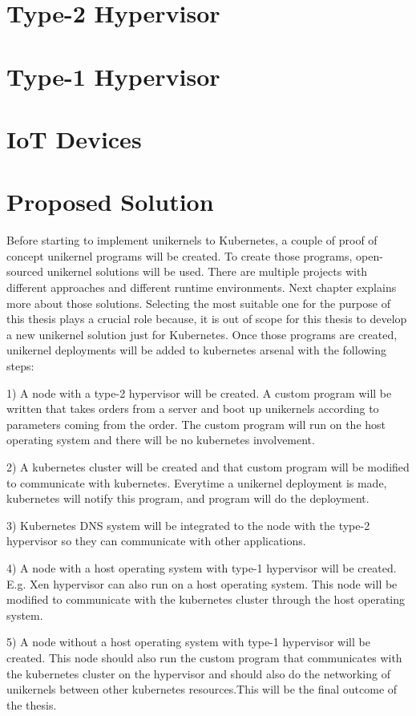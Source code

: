 \section{Type-2 Hypervisor}
\section{Type-1 Hypervisor}
\section{IoT Devices}


\section{Proposed Solution}

Before starting to implement unikernels to Kubernetes, a couple of proof of concept unikernel programs will be created. To create those programs, open-sourced unikernel solutions will be used. There are multiple projects with different approaches and different runtime environments. Next chapter explains more about those solutions. Selecting the most suitable one for the purpose of this thesis plays a crucial role because, it is out of scope for this thesis to develop a new unikernel solution just for Kubernetes. Once those programs are created, unikernel deployments will be added to kubernetes arsenal with the following steps:

1) A node with a type-2 hypervisor will be created. A custom program will be written that takes orders from a server and boot up unikernels according to parameters coming from the order. The custom program will run on the host operating system and there will be no kubernetes involvement.

2) A kubernetes cluster will be created and that custom program will be modified to communicate with kubernetes. Everytime a unikernel deployment is made, kubernetes will notify this program, and program will do the deployment.

3) Kubernetes DNS system will be integrated to the node with the type-2 hypervisor so they can communicate with other applications.

4) A node with a host operating system with type-1 hypervisor will be created. E.g. Xen hypervisor can also run on a host operating system. This node will be modified to communicate with the kubernetes cluster through the host operating system. 

5) A node without a host operating system with type-1 hypervisor will be created. This node should also run the custom program that communicates with the kubernetes cluster on the hypervisor and should also do the networking of unikernels between other kubernetes resources.This will be the final outcome of the thesis.


